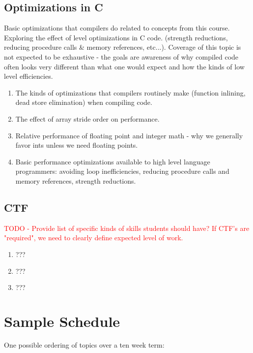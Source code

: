 \documentclass[12pt,letterpaper]{article}
\begin{document}
	\subsection{Optimizations in C}

	Basic optimizations that compilers do related to concepts from this course. Exploring the effect of level optimizations in C code. (strength reductions, reducing procedure calls \& memory references, etc...). Coverage of this topic is not expected to be exhaustive - the goals are awareness of why compiled code often looks very different than what one would expect and how the kinds of low level efficiencies.

	\begin{enumerate}
		\item The kinds of optimizations that compilers routinely make (function inlining, dead store elimination) when compiling code.
		\item The effect of array stride order on performance.
		\item Relative performance of floating point and integer math - why we generally favor ints unless we need floating points.
		\item Basic performance optimizations available to high level language programmers: avoiding loop inefficiencies, reducing procedure calls and memory references, strength reductions.
	\end{enumerate}


	\subsection{CTF}

	\textcolor{red}{TODO - Provide list of specific kinds of skills students should have? If CTF's are "required", we need to clearly define expected level of work.}

	\begin{enumerate}
		\item ???
		\item ???
		\item ???
	\end{enumerate}



	\clearpage
	\section{Sample Schedule}

	One possible ordering of topics over a ten week term:
\end{document}
